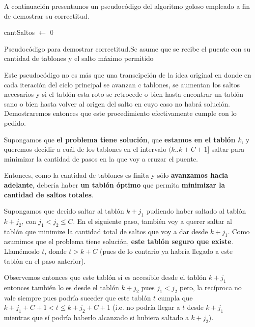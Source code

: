 A continuaci\'on presentamos un pseudoc\'odigo del algoritmo goloso empleado a fin de demostrar su correctitud.

\begin{algorithm}[H]
	 cantSaltos $\leftarrow$ 0 \\
         \caption{Pseudoc\'odigo para demostrar correctitud.Se asume que se recibe el puente con su cantidad de tablones y el salto máximo permitido}
\end{algorithm}

Este pseudocódigo no es más que una transcipción de la idea original en donde en cada iteración del ciclo principal se avanzan c tablones, se aumentan los saltos necesarios y si el tablón esta roto se retrocede o bien hasta encontrar un tablón sano o bien hasta volver al origen del salto en cuyo caso no habrá solución. Demostraremos entonces que este procedimiento efectivamente cumple con lo pedido.

Supongamos que \textbf{el problema tiene soluci\'on}, que \textbf{estamos en el tabl\'on $k$}, y queremos decidir a cu\'al de los tablones en el intervalo $(k..k+C+1]$ saltar para minimizar la cantidad de pasos en la que voy a cruzar el puente. 

Entonces, como la cantidad de tablones es finita y s\'olo \textbf{avanzamos hacia adelante}, deber\'ia haber \textbf{un tabl\'on \'optimo }que permita \textbf{minimizar la cantidad de saltos totales}.

Supongamos que decido saltar al tabl\'on $k+j_{1}$ pudiendo haber saltado al tabl\'on $k+j_{2}$, con $j_{1} < j_{2} \leq C$. En el siguiente paso, tambi\'en voy a querer saltar al tabl\'on que minimize la cantidad total de saltos que voy a dar desde $k+j_{1}$. Como asumimos que el problema tiene soluci\'on, \textbf{este tabl\'on seguro que existe}. Llam\'emoslo $t$, donde $t > k+C$ (pues de lo contario ya habr\'ia llegado a este tabl\'on en el paso anterior). 

Observemos entonces que este tabl\'on si es accesible desde el tabl\'on $k+j_{1}$ entonces tambi\'en lo es desde el tabl\'on $k+j_{2}$ pues $j_{1} < j_{2} $ pero, la rec\'iproca no vale siempre pues podr\'ia suceder que este tabl\'on $t$ cumpla que $k+j_{1}+C+1 < t \leq k+j_{2}+C+1 $ (i.e. no podr\'ia llegar a $t$ desde $k+j_{1}$ mientras que s\'i podr\'ia haberlo alcanzado si hubiera saltado a $k+j_{2}$). 

